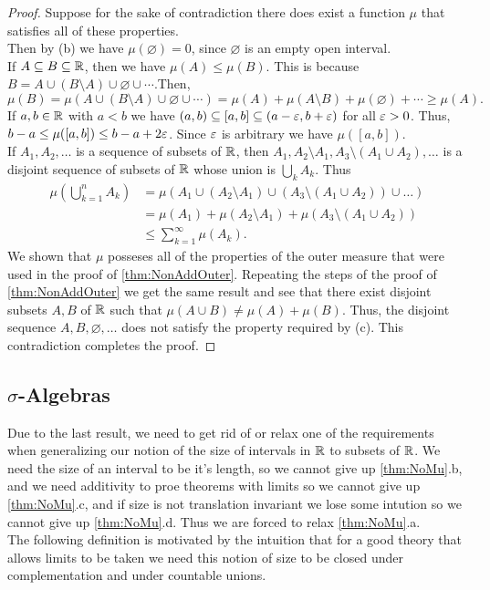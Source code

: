 \documentclass[twoside, openright, fontsize=10pt, headings=big]{scrbook}
\newcommand{\addunumberedsubsec}[1]{%
    \subsection*{#1}%
    \addcontentsline{toc}{subsection}{#1}%
}
\begin{document}
\begin{proof}
    Suppose for the sake of contradiction there does exist a function $\mu$ that satisfies all of these properties.\\
    Then by (b) we have $\mu(\varnothing)=0$, since $\varnothing$ is an empty open interval.\\
    If $A\subseteq B\subseteq\mathbb{R}$, then we have $\mu(A)\leq\mu(B)$. This is because $B=A\cup(B\setminus A)\cup\varnothing\cup\cdots$.Then,
    \[
        \mu(B)=\mu(A\cup(B\setminus A)\cup\varnothing\cup\cdots)=\mu(A)+\mu(A\setminus B)+\mu(\varnothing)+\cdots\geq\mu(A).
    \]
    If $a,b\in\mathbb{R}$ with $a<b$ we have $(a,b)\subseteq[a,b]\subseteq(a-\varepsilon,b+\varepsilon)$ for all $\varepsilon>0$. Thus, $b-a\leq\mu([a,b])\leq b-a+2\varepsilon$. Since $\varepsilon$ is arbitrary we have $\mu([a,b])$.\\
    If $A_1,A_2,\dots$ is a sequence of subsets of $\mathbb{R}$, then $A_1,A_2\setminus A_1,A_3\setminus(A_1\cup A_2),\dots$ is a disjoint sequence of subsets of $\mathbb{R}$ whose union is $\bigcup_{k}A_k$. Thus
    \begin{align*}
        \mu\left(\bigcup_{k=1}^{n}A_k\right)&=\mu\left(A_1\cup(A_2\setminus A_1)\cup (A_3\setminus(A_1\cup A_2))\cup\dots\right)\\
        &=\mu(A_1)+\mu(A_2\setminus A_1)+\mu(A_3\setminus(A_1\cup A_2))\\
        &\leq\sum_{k=1}^{\infty}\mu(A_k).
    \end{align*}
    We shown that $\mu$ posseses all of the properties of the outer measure that were used in the proof of \ref{thm:NonAddOuter}. Repeating the steps of the proof of \ref{thm:NonAddOuter} we get the same result and see that there exist disjoint subsets $A,B$ of $\mathbb{R}$ such that $\mu(A\cup B)\neq\mu(A)+\mu(B)$. Thus, the disjoint sequence $A,B,\varnothing,\dots$ does not satisfy the property required by (c). This contradiction completes the proof.
\end{proof}
\addunumberedsubsec{$\sigma$-Algebras}
Due to the last result, we need to get rid of or relax one of the requirements when generalizing our notion of the size of intervals in $\mathbb{R}$ to subsets of $\mathbb{R}$. We need the size of an interval to be it's length, so we cannot give up \ref{thm:NoMu}.b, and we need additivity to proe theorems with limits so we cannot give up \ref{thm:NoMu}.c, and if size is not translation invariant we lose some intution so we cannot give up \ref{thm:NoMu}.d. Thus we are forced to relax \ref{thm:NoMu}.a.\\
The following definition is motivated by the intuition that for a good theory that allows limits to be taken we need this notion of size to be closed under complementation and under countable unions.
\end{document}
